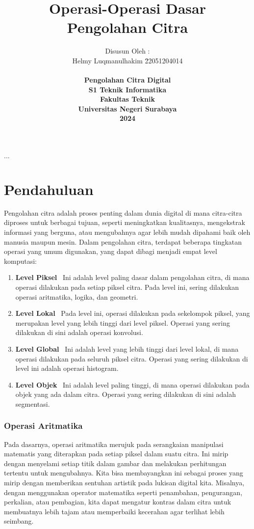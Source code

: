 \documentclass[a4paper,12pt,openany]{book}
\title{Operasi-Operasi Dasar \\Pengolahan Citra}
\author{
\begin{tabbing}
Disusun Oleh : \\ Helmy Luqmanulhakim \hspace{5em} \= 22051204014 \\
\end{tabbing}
\vspace{5em}
\begin{flushleft}
\textbf{Pengolahan Citra Digital} \vspace{0.2em} \\
\textbf{S1 Teknik Informatika} \vspace{0.2em} \\
\textbf{Fakultas Teknik} \vspace{0.2em} \\
\textbf{Universitas Negeri Surabaya} \vspace{0.2em}\\
\textbf{2024} \vspace{0.2em}
\end{flushleft}
}
\date{}
\begin{document}
\maketitle
\thispagestyle{fancy}

\tableofcontents

...


\chapter{Pendahuluan}


Pengolahan citra adalah proses penting dalam dunia digital di mana citra-citra diproses untuk berbagai tujuan, seperti meningkatkan kualitasnya, mengekstrak informasi yang berguna, atau mengubahnya agar lebih mudah dipahami baik oleh manusia maupun mesin. Dalam pengolahan citra, terdapat beberapa tingkatan operasi yang umum digunakan, yang dapat dibagi menjadi empat level komputasi:

\begin{enumerate}
    \item \textbf{Level Piksel} \
          Ini adalah level paling dasar dalam pengolahan citra, di mana operasi dilakukan pada setiap piksel citra. Pada level ini, sering dilakukan operasi aritmatika, logika, dan geometri.
    \item \textbf{Level Lokal} \
          Pada level ini, operasi dilakukan pada sekelompok piksel, yang merupakan level yang lebih tinggi dari level piksel. Operasi yang sering dilakukan di sini adalah operasi konvolusi.
    \item \textbf{Level Global} \
          Ini adalah level yang lebih tinggi dari level lokal, di mana operasi dilakukan pada seluruh piksel citra. Operasi yang sering dilakukan di level ini adalah operasi histogram.
    \item \textbf{Level Objek} \
          Ini adalah level paling tinggi, di mana operasi dilakukan pada objek yang ada dalam citra. Operasi yang sering dilakukan di sini adalah segmentasi.
\end{enumerate}

\subsection{Operasi Aritmatika}

Pada dasarnya, operasi aritmatika merujuk pada serangkaian manipulasi matematis yang diterapkan pada setiap piksel dalam suatu citra. Ini mirip dengan menyelami setiap titik dalam gambar dan melakukan perhitungan tertentu untuk mengubahnya. Kita bisa membayangkan ini sebagai proses yang mirip dengan memberikan sentuhan artistik pada lukisan digital kita. Misalnya, dengan menggunakan operator matematika seperti penambahan, pengurangan, perkalian, atau pembagian, kita dapat mengatur kontras dalam citra untuk membuatnya lebih tajam atau memperbaiki kecerahan agar terlihat lebih seimbang.
\end{document}
